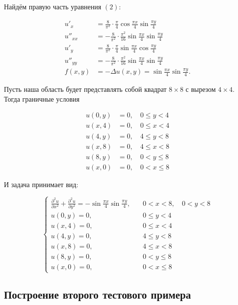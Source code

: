 \documentclass[a4paper, 12pt]{article} %
\begin{document}
Найдём правую часть уравнения $ (2) $:

\[
\begin{aligned}
u'_x &= \frac{8}{\pi^2} \cdot \frac{\pi}{4} \cos{\frac{\pi x}{4}} \sin{\frac{\pi y}{4}} \\
u''_{xx} &= - \frac{8}{\pi^2} \cdot \frac{\pi^2}{16} \sin{\frac{\pi x}{4}} \sin{\frac{\pi y}{4}} \\
u'_y &= \frac{8}{\pi^2} \cdot \frac{\pi}{4} \sin{\frac{\pi x}{4}} \cos{\frac{\pi y}{4}} \\
u''_{yy} &= - \frac{8}{\pi^2} \cdot \frac{\pi^2}{16} \sin{\frac{\pi x}{4}} \sin{\frac{\pi y}{4}} \\
f(x, y) &= - \Delta u(x, y) = \sin{\frac{\pi x}{4}} \sin{\frac{\pi y}{4}} .
\end{aligned}
\]

Пусть наша область будет представлять собой квадрат $ 8 \times 8 $  с вырезом $ 4 \times 4 $. Тогда граничные условия 

\[
\begin{aligned}
u(0, y) &= 0, \quad 0 \leq y < 4 \\
u(x, 4) &= 0, \quad 0 \leq x < 4 \\
u(4, y) &= 0, \quad 4 \leq y < 8 \\
u(x, 8) &= 0, \quad 4 \leq x < 8 \\
u(8, y) &= 0, \quad 0 < y \leq 8 \\
u(x, 0) &= 0, \quad 0 < x \leq 8
\end{aligned}
\]

И задача принимает вид:

\begin{equation}
\begin{cases}
\frac{\partial^2 u}{\partial x^2} + \frac{\partial^2 u}{\partial y^2} = - \sin{\frac{\pi x}{4}} \sin{\frac{\pi y}{4}}, \quad &0 < x < 8, \quad 0 < y < 8 \\
u(0, y) = 0, \quad &0 \leq y < 4 \\
u(x, 4) = 0, \quad &0 \leq x < 4 \\
u(4, y) = 0, \quad &4 \leq y < 8 \\
u(x, 8) = 0, \quad &4 \leq x < 8 \\
u(8, y) = 0, \quad &0 < y \leq 8 \\
u(x, 0) = 0, \quad &0 < x \leq 8
\end{cases}
\end{equation}

\subsection{Построение второго тестового примера}
\end{document}
